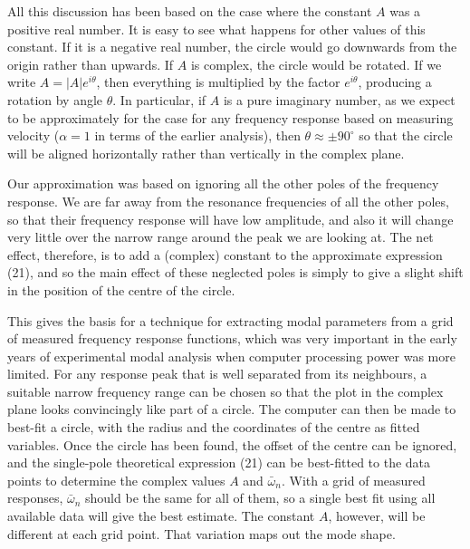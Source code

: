   All this discussion has been based on the case where the constant $A$ was a 
  positive real number. It is easy to see what happens for other values of this 
  constant. If it is a negative real number, the circle would go downwards from 
  the origin rather than upwards. If $A$ is complex, the circle would be 
  rotated. If we write $A=|A| e^{i \theta}$, then everything is multiplied by 
  the factor $e^{i \theta}$, producing a rotation by angle $\theta$. In 
  particular, if $A$ is a pure imaginary number, as we expect to be 
  approximately for the case for any frequency response based on measuring 
  velocity ($\alpha = 1$ in terms of the earlier analysis), then $\theta 
  \approx \pm 90^\circ$ so that the circle will be aligned horizontally rather 
  than vertically in the complex plane. 

  Our approximation was based on ignoring all the other poles of the frequency 
  response. We are far away from the resonance frequencies of all the other 
  poles, so that their frequency response will have low amplitude, and also it 
  will change very little over the narrow range around the peak we are looking 
  at. The net effect, therefore, is to add a (complex) constant to the 
  approximate expression (21), and so the main effect of these neglected poles 
  is simply to give a slight shift in the position of the centre of the circle. 

  This gives the basis for a technique for extracting modal parameters from a 
  grid of measured frequency response functions, which was very important in 
  the early years of experimental modal analysis when computer processing power 
  was more limited. For any response peak that is well separated from its 
  neighbours, a suitable narrow frequency range can be chosen so that the plot 
  in the complex plane looks convincingly like part of a circle. The computer 
  can then be made to best-fit a circle, with the radius and the coordinates of 
  the centre as fitted variables. Once the circle has been found, the offset of 
  the centre can be ignored, and the single-pole theoretical expression (21) 
  can be best-fitted to the data points to determine the complex values $A$ and 
  $\bar{\omega}_n$. With a grid of measured responses, $\bar{\omega}_n$ should 
  be the same for all of them, so a single best fit using all available data 
  will give the best estimate. The constant $A$, however, will be different at 
  each grid point. That variation maps out the mode shape. 

